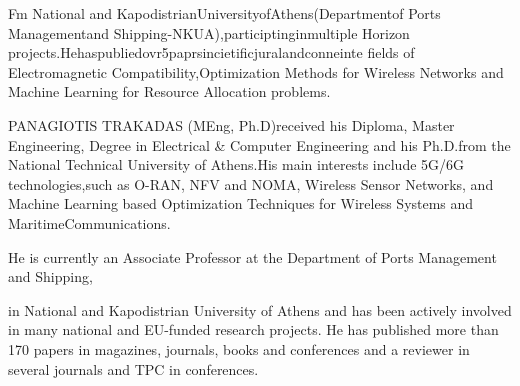 \documentclass{article}
\begin{document}
Fm National and KapodistrianUniversityofAthens(Departmentof Ports Managementand Shipping-NKUA),participtinginmultiple Horizon projects.Hehaspubliedovr5paprsincietificjuralandconneinte fields of Electromagnetic Compatibility,Optimization Methods for Wireless Networks and Machine Learning for Resource Allocation problems.

PANAGIOTIS TRAKADAS (MEng, Ph.D)received his Diploma, Master Engineering, Degree in Electrical \& Computer Engineering and his Ph.D.from the National Technical University of Athens.His main interests include 5G/6G technologies,such as O-RAN, NFV and NOMA, Wireless Sensor Networks, and Machine Learning based Optimization Techniques for Wireless Systems and MaritimeCommunications.

He is currently an Associate Professor at the Department of Ports Management and Shipping,

in National and Kapodistrian University of Athens and has been actively involved in many national and EU-funded research projects. He has published more than 170 papers in magazines, journals, books and conferences and a reviewer in several journals and TPC in conferences.
\end{document}
